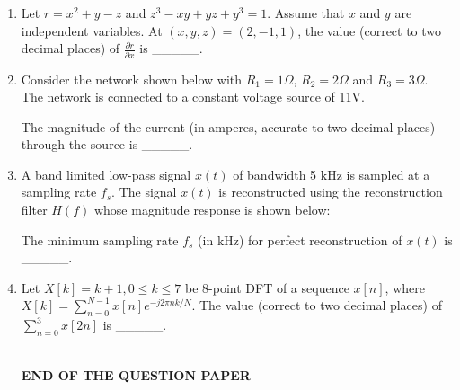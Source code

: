 \documentclass{article}
\begin{document}
\begin{enumerate}
\item Let $r = x^2 + y - z$ and $z^3 - xy + yz + y^3 = 1$. Assume that $x$ and $y$ are independent variables. At $(x, y, z) = (2, -1, 1)$, the value (correct to two decimal places) of $\frac{\partial r}{\partial x}$ is \_\_\_\_\_.

\item Consider the network shown below with $R_1 = 1\Omega$, $R_2 = 2\Omega$ and $R_3 = 3\Omega$. The network is connected to a constant voltage source of 11V.
\begin{figure}[H]
    \centering
    
    \caption{}
    \label{fig:q63}
\end{figure}
The magnitude of the current (in amperes, accurate to two decimal places) through the source is \_\_\_\_\_.

\item A band limited low-pass signal $x(t)$ of bandwidth 5 kHz is sampled at a sampling rate $f_s$. The signal $x(t)$ is reconstructed using the reconstruction filter $H(f)$ whose magnitude response is shown below:
\begin{figure}[H]
    \centering
    
    \caption{}
    \label{fig:q64}
\end{figure}
The minimum sampling rate $f_s$ (in kHz) for perfect reconstruction of $x(t)$ is \_\_\_\_\_.

\item Let $X[k] = k + 1, 0 \leq k \leq 7$ be 8-point DFT of a sequence $x[n]$, where $X[k] = \sum_{n=0}^{N-1} x[n] e^{-j2\pi nk/N}$. The value (correct to two decimal places) of $\sum_{n=0}^{3} x[2n]$ is \_\_\_\_\_.

\\
\centering
\large
\textbf{END OF THE QUESTION PAPER}

\end{enumerate}
\end{document}
